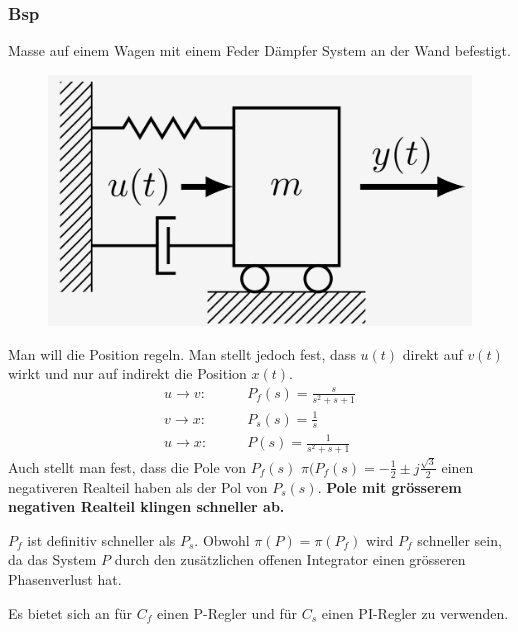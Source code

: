     \subsubsection{Bsp}
        Masse auf einem Wagen mit einem Feder Dämpfer System an der Wand befestigt.
        \begin{figure}[H]
            \centering
            \includegraphics[width = 0.25\linewidth]{images/04/kask_bsp.jpeg}
        \end{figure}
        Man will die Position regeln. Man stellt jedoch fest, dass $u(t)$ direkt auf $v(t)$ wirkt und nur auf indirekt die Position $x(t)$.
        \begin{align*}
            u\rightarrow v: \qquad &P_f(s) = \frac{s}{s^2+s+1}\\
            v\rightarrow x: \qquad &P_s(s) = \frac{1}{s}\\
            u\rightarrow x: \qquad &P(s) = \frac{1}{s^2+s+1}
        \end{align*}
        Auch stellt man fest, dass die Pole von $P_f(s)$ $\pi(P_f(s) = -\frac{1}{2}\pm j\frac{\sqrt{3}}{2}$ einen negativeren Realteil haben als der Pol von $P_s(s)$. \textbf{Pole mit grösserem negativen Realteil klingen schneller ab.}
        
        $P_f$ ist definitiv schneller als $P_s$. Obwohl $\pi(P) =\pi(P_f)$ wird $P_f$ schneller sein, da das System $P$ durch den zusätzlichen offenen Integrator einen grösseren Phasenverlust hat.
        
        Es bietet sich an für $C_f$ einen P-Regler und für $C_s$ einen PI-Regler zu verwenden.
